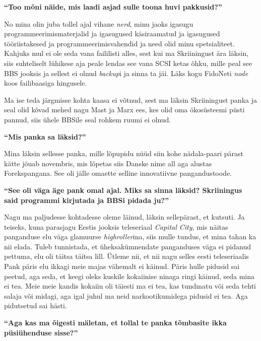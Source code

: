 \textbf{\enquote{Too mõni näide, mis laadi asjad sulle toona huvi pakkusid?}}

No mina olin juba tollel ajal vihane \emph{nerd}, minu jaoks igasugu 
programmeerimismaterjalid ja igasugused käsiraamatud ja igasugused 
tööriistakesed ja  programmeerimisvahendid ja need olid minu spetsialiteet. 
Kahjuks mul ei ole seda vana faililisti alles, sest kui ma Skriiningust ära 
läksin, siis suhteliselt lühikese aja peale lendas see vana SCSI ketas õhku, 
mille peal see BBS jooksis ja sellest ei olnud \emph{backup}i ja sinna ta jäi. 
Läks kogu FidoNeti \emph{node} koos failibaasiga hingusele.

Ma ise teda järgmisse kohta kaasa ei võtnud, sest ma läksin Skriiningust panka 
ja seal olid kõvad mehed nagu Mast ja  Marx  ees, kes olid oma ökosüsteemi püsti pannud, siis ühele BBSile seal rohkem ruumi ei olnud. 

\textbf{\enquote{Mis panka sa läksid?}}

Mina läksin sellesse panka, mille lõpupidu nüüd siin kohe nädala-paari pärast 
kätte jõuab 
novembris, mis lõpetas siis Danske nime all aga alustas Forekspangana. See 
oli jälle omaette selline innovatiivne pangandustoode. 

\textbf{\enquote{See oli väga äge pank omal ajal. Miks sa sinna läksid? 
Skriiningus said programmi kirjutada ja BBSi pidada ju?}}

Nagu ma paljudesse kohtadesse oleme läinud, läksin sellepärast, et kutsuti. Ja 
teiseks, kuna parasjagu Eestis jooksis teleseriaal \emph{Capital City}, mis 
näitas panganduse elu väga glamuurse \emph{highroller}ina, siis mulle tundus, 
et mina tahan ka nii elada. Tuleb tunnistada, et üheksakümnendate panganduses  
väga ei pidanud pettuma, elu oli täitsa täitsa lill. Ütleme nii, et nii nagu 
selles eesti teleseriaalis Pank päris elu ikkagi meie majas vähemalt ei käinud. 
Päris hulle pidusid sai peetud, aga seda, et keegi oleks kuskile kokaiinise  
ninaga ringi käinud, seda mina ei tea. Meie meie kandis  kokaiin oli täiesti ma 
ei tea, kas tundmatu või seda tehti salaja või midagi, aga igal juhul ma neid 
narkootikumidega pidusid ei tea. Aga pidutsetud sai hästi.

\textbf{\enquote{Aga kas ma õigesti mäletan, et tollal te panka tõmbasite ikka 
püsiühenduse sisse?}}

